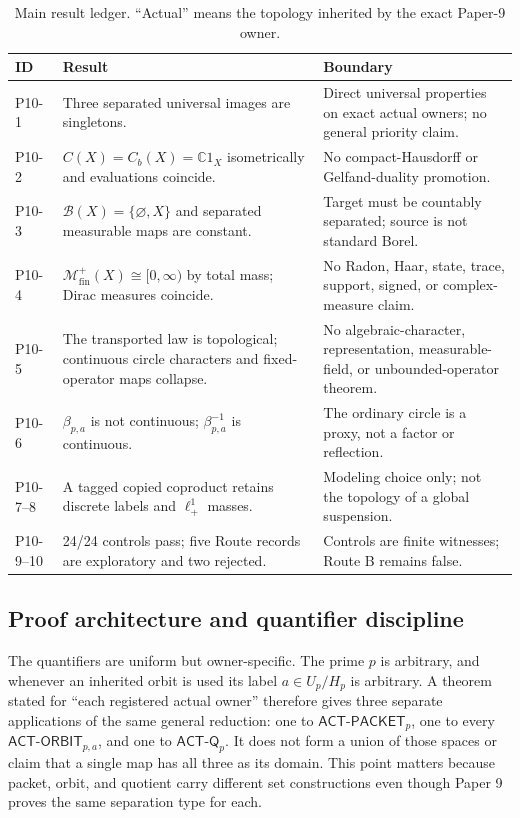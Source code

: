 \documentclass[11pt]{article}
\theoremstyle{definition}
\newcommand{\Borel}{\mathcal B}
\newcommand{\C}{\mathbb C}
\newcommand{\Mfin}{\mathcal M_{\mathrm{fin}}^+}
\newcommand{\ACTP}{\mathsf{ACT\mbox{-}PACKET}_p}
\newcommand{\ACTO}{\mathsf{ACT\mbox{-}ORBIT}_{p,a}}
\newcommand{\ACTQ}{\mathsf{ACT\mbox{-}Q}_p}
\begin{document}
\begin{table}[htbp]
\centering\small
\caption{Main result ledger.  ``Actual'' means the topology inherited by the exact Paper-9 owner.}
\label{tab:mainledger}
\begin{tabularx}{\textwidth}{P{0.13\textwidth}P{0.29\textwidth}Y}
\toprule
ID & Result & Boundary \\
\midrule
P10-1 & Three separated universal images are singletons. & Direct universal properties on exact actual owners; no general priority claim.\\
P10-2 & $C(X)=C_b(X)=\C1_X$ isometrically and evaluations coincide. & No compact-Hausdorff or Gelfand-duality promotion.\\
P10-3 & $\Borel(X)=\{\varnothing,X\}$ and separated measurable maps are constant. & Target must be countably separated; source is not standard Borel.\\
P10-4 & $\Mfin(X)\cong[0,\infty)$ by total mass; Dirac measures coincide. & No Radon, Haar, state, trace, support, signed, or complex-measure claim.\\
P10-5 & The transported law is topological; continuous circle characters and fixed-operator maps collapse. & No algebraic-character, representation, measurable-field, or unbounded-operator theorem.\\
P10-6 & $\beta_{p,a}$ is not continuous; $\beta_{p,a}^{-1}$ is continuous. & The ordinary circle is a proxy, not a factor or reflection.\\
P10-7--8 & A tagged copied coproduct retains discrete labels and $\ell^1_+$ masses. & Modeling choice only; not the topology of a global suspension.\\
P10-9--10 & 24/24 controls pass; five Route records are exploratory and two rejected. & Controls are finite witnesses; Route B remains false.\\
\bottomrule
\end{tabularx}
\end{table}

\subsection{Proof architecture and quantifier discipline}

The quantifiers are uniform but owner-specific.  The prime $p$ is arbitrary, and whenever an inherited orbit is used its label $a\in U_p/H_p$ is arbitrary.  A theorem stated for ``each registered actual owner'' therefore gives three separate applications of the same general reduction: one to $\ACTP$, one to every $\ACTO$, and one to $\ACTQ$.  It does not form a union of those spaces or claim that a single map has all three as its domain.  This point matters because packet, orbit, and quotient carry different set constructions even though Paper 9 proves the same separation type for each.
\end{document}
